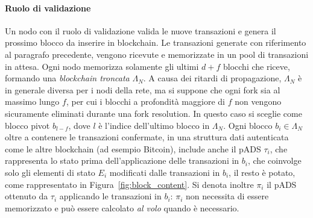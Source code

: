 \paragraph*{Ruolo di validazione}
Un nodo con il ruolo di validazione valida le nuove transazioni e genera il prossimo blocco da inserire in blockchain. Le transazioni generate con riferimento al paragrafo precedente, vengono ricevute e memorizzate in un pool di transazioni in attesa. Ogni nodo memorizza solamente gli ultimi $d + f$ blocchi che riceve, formando una \emph{blockchain troncata} $\Lambda_N$. A causa dei ritardi di propagazione, $\Lambda_N$ è in generale diversa per i nodi della rete, ma si suppone che ogni fork sia al massimo lungo $f$, per cui i blocchi a profondità maggiore di $f$ non vengono sicuramente eliminati durante una fork resolution.
In questo caso si sceglie come blocco pivot $b_{l-f}$, dove $l$ è l'indice dell'ultimo blocco in $\Lambda_N$. Ogni blocco $b_i \in \Lambda_N$ oltre a contenere le transazioni confermate, in una struttura dati autenticata come le altre blockchain (ad esempio Bitcoin), include anche il pADS $\tau_i$, che rappresenta lo stato prima dell'applicazione delle transazioni in $b_i$, che coinvolge solo gli elementi di stato $E_i$ modificati dalle transazioni in $b_i$, il resto è potato, come rappresentato in Figura~\ref{fig:block_content}. Si denota inoltre $\pi_i$ il pADS ottenuto da $\tau_i$ applicando le transazioni in $b_i$: $\pi_i$ non necessita di essere memorizzato e può essere calcolato \emph{al volo} quando è necessario.


